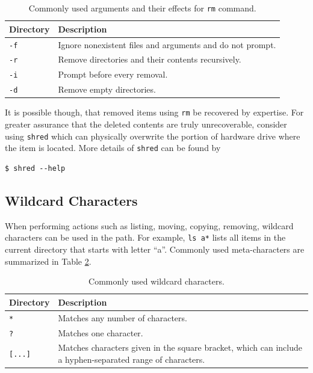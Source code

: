 \begin{table}[!htb]
  \centering \caption{Commonly used arguments and their effects for \texttt{rm} command.}\label{ch:fm:tab:rmcommandargument}
  \begin{tabularx}{\textwidth}{lX}
    \hline
    Directory & Description \\ \hline
    \verb|-f| & Ignore nonexistent files and arguments and do not prompt. \\ 
    \verb|-r| & Remove directories and their contents recursively. \\ 
    \verb|-i| & Prompt before every removal. \\ 
    \verb|-d| & Remove empty directories. \\
    \hline
  \end{tabularx}
\end{table}

It is possible though, that removed items using \verb|rm| be recovered by expertise. For greater assurance that the deleted contents are truly unrecoverable, consider using \verb|shred| which can physically overwrite the portion of hardware drive where the item is located. More details of \verb|shred| can be found by
\begin{lstlisting}
$ shred --help
\end{lstlisting}

\subsection{Wildcard Characters}

When performing actions such as listing, moving, copying, removing, wildcard characters can be used in the path. For example, \verb|ls a*| lists all items in the current directory that starts with letter ``a''. Commonly used meta-characters are summarized in Table \ref{ch:fm:tab:metacharacters}.

\begin{table}[!htb]
  \centering \caption{Commonly used wildcard characters.}\label{ch:fm:tab:metacharacters}
  \begin{tabularx}{\textwidth}{lX}
    \hline
    Directory & Description \\ \hline
    \verb|*| & Matches any number of characters. \\ 
    \verb|?| & Matches one character. \\ 
    \verb|[...]| & Matches characters given in the square bracket, which can include a hyphen-separated range of characters. \\
    \hline
  \end{tabularx}
\end{table}

